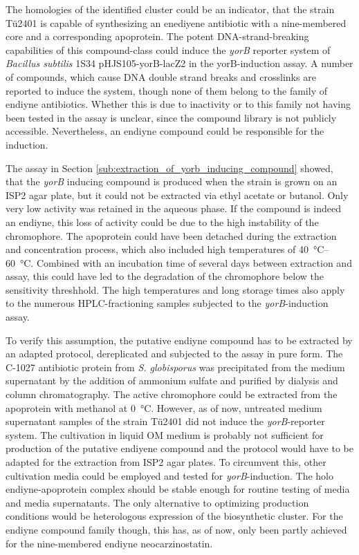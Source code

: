 	 The homologies of the identified cluster could be an indicator, that the strain Tü2401 is capable of synthesizing an enediyene antibiotic with a nine-membered core and a corresponding apoprotein. The potent DNA-strand-breaking capabilities of this compound-class could induce the \textit{yorB} reporter system of \textit{Bacillus subtilis} 1S34 pHJS105-yorB-lacZ2 in the yorB-induction assay. A number of compounds, which cause DNA double strand breaks and crosslinks are reported to induce the system, though none of them belong to the family of endiyne antibiotics. \autocite{Urban2007} Whether this is due to inactivity or to this family not having been tested in the assay is unclear, since the compound library is not publicly accessible. Nevertheless, an endiyne compound could be responsible for the induction.
	 
	 The assay in Section \ref{sub:extraction_of_yorb_inducing_compound} showed, that the \textit{yorB} inducing compound is produced when the strain is grown on an ISP2 agar plate, but it could not be extracted via ethyl acetate or butanol. Only very low activity was retained in the aqueous phase. If the compound is indeed an endiyne, this loss of activity could be due to the high instability of the chromophore. The apoprotein could have been detached during the extraction and concentration process, which also included high temperatures of \SIrange[range-units=single]{40}{60}{\celsius}. Combined with an incubation time of several days between extraction and assay, this could have led to the degradation of the chromophore below the sensitivity threshhold. The high temperatures and long storage times also apply to the numerous HPLC-fractioning samples subjected to the \textit{yorB}-induction assay. 
	 
	 To verify this assumption, the putative endiyne compound has to be extracted by an adapted protocol, dereplicated and subjected to the assay in pure form. The C-1027 antibiotic protein from \textit{S. globisporus} was precipitated from the medium supernatant by the addition of ammonium sulfate and purified by dialysis and column chromatography.\autocite{Otani1988a} The active chromophore could be extracted from the apoprotein with methanol at \SI{0}{\celsius}. \autocite{Matsumoto1993} However, as of now, untreated medium supernatant samples of the strain Tü2401 did not induce the \textit{yorB}-reporter system. The cultivation in liquid OM medium is probably not sufficient for production of the putative endiyene compound and the protocol would have to be adapted for the extraction from ISP2 agar plates. To circumvent this, other cultivation media could be employed and tested for \textit{yorB}-induction. The holo endiyne-apoprotein complex should be stable enough for routine testing of media and media supernatants. The only alternative to optimizing production conditions would be heterologous expression of the biosynthetic cluster. For the endiyne compound family though, this has, as of now, only been partly achieved for the nine-membered endiyne neocarzinostatin.\autocite{Zhang2008}
	 
